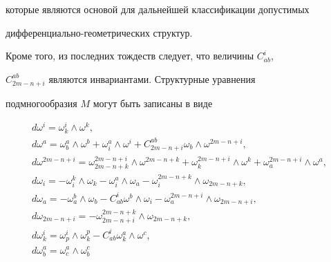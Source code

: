 которые являются основой для дальнейшей классификации допустимых


диф\-фе\-рен\-ци\-аль\-но-гео\-мет\-ри\-чес\-ких структур.


Кроме того, из последних тождеств следует, что величины $C^i_{ab}$,


$C^{ab}_{2m-n+i}$ являются инвариантами. Структурные уравнения


подмногообразия $M$ могут быть записаны в виде


\begin{equation}


\label{eq_ar_10}


\begin{array}{l}


d\omega^i=\omega^i_k\wedge \omega^k,\\


%


d\omega^a=\omega^a_b\wedge \omega^b+\omega^a_i\wedge \omega^i+


C^{ab}_{2m-n+i}\omega_b\wedge \omega^{2m-n+i},\\


%


d\omega^{2m-n+i}=\omega^{2m-n+i}_{2m-n+k}\wedge \omega^{2m-


n+k}+\omega^{2m-n+i}_k\wedge \omega^k +\omega^{2m-n+i}_a\wedge


\omega^a,\\


%


d\omega_i=-\omega^k_i\wedge \omega_k-\omega^a_i\wedge \omega_a-


\omega^{2m-n+k}_i\wedge \omega_{2m-n+k},\\


%


d\omega_a=-\omega^b_a\wedge \omega_b-


C^i_{ab}\omega^b\wedge \omega_i- \omega^{2m-n+i}_a \wedge \omega_{2m-n+i},\\


%


d\omega_{2m-n+i}=-\omega^{2m-n+k}_{2m-n+i}\wedge \omega_{2m-n+k},\\


%


d\omega^i_k=\omega^i_p\wedge \omega^p_k


-C^i_{ab}\omega^a_k\wedge \omega^c,\\


%


d\omega^a_b=\omega^a_c\wedge \omega^c_b



\end{array}
\end{equation}
